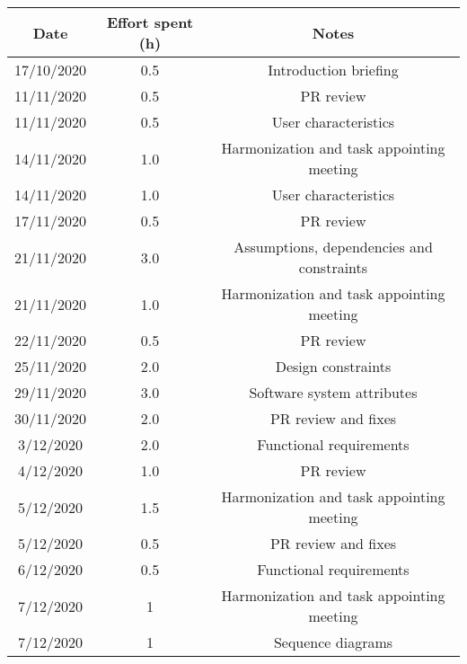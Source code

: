 \documentclass[../../main.tex]{subfiles}
\begin{document}
\begin{center}
    \begin{tabular}{|c| |c| |c|} 
        \hline
        Date & Effort spent (h) & Notes\\ [0.5ex] 
        \hline\hline
        17/10/2020 & 0.5 & Introduction briefing\\ 
        11/11/2020 & 0.5 & PR review\\
        11/11/2020 & 0.5 & User characteristics\\
        14/11/2020 & 1.0 & Harmonization and task appointing meeting\\
        14/11/2020 & 1.0 & User characteristics\\
        17/11/2020 & 0.5 & PR review\\
        21/11/2020 & 3.0 & Assumptions, dependencies and constraints\\
        21/11/2020 & 1.0 & Harmonization and task appointing meeting\\
        22/11/2020 & 0.5 & PR review\\
        25/11/2020 & 2.0 & Design constraints\\
        29/11/2020 & 3.0 & Software system attributes\\
        30/11/2020 & 2.0 & PR review and fixes\\
        3/12/2020 & 2.0 & Functional requirements\\
        4/12/2020 & 1.0 & PR review \\
        5/12/2020 & 1.5 & Harmonization and task appointing meeting\\
        5/12/2020 & 0.5 & PR review and fixes\\
        6/12/2020 & 0.5 & Functional requirements\\
        7/12/2020 & 1 & Harmonization and task appointing meeting\\
        7/12/2020 & 1 & Sequence diagrams\\
        \hline
    \end{tabular}
\end{center}
\end{document}
